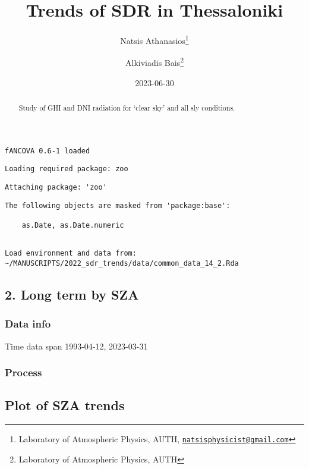 \documentclass[
  10pt,
  a4paper,oneside]{article}
\title{Trends of SDR in Thessaloniki}
\author{Natsis Athanasios\footnote{Laboratory of Atmospheric Physics, AUTH, \href{mailto:natsisphysicist@gmail.com}{\nolinkurl{natsisphysicist@gmail.com}}} \and Alkiviadis Bais\footnote{Laboratory of Atmospheric Physics, AUTH}}
\date{2023-06-30}
\begin{document}
\maketitle
\begin{abstract}
Study of GHI and DNI radiation for `clear sky' and all sly conditions.
\end{abstract}

{
\hypersetup{linkcolor=}
\setcounter{tocdepth}{4}
\tableofcontents
}
\begin{verbatim}
fANCOVA 0.6-1 loaded
\end{verbatim}

\begin{verbatim}
Loading required package: zoo
\end{verbatim}

\begin{verbatim}
Attaching package: 'zoo'
\end{verbatim}

\begin{verbatim}
The following objects are masked from 'package:base':

    as.Date, as.Date.numeric
\end{verbatim}

\begin{verbatim}

Load environment and data from:  ~/MANUSCRIPTS/2022_sdr_trends/data/common_data_14_2.Rda 
\end{verbatim}

\hypertarget{long-term-by-sza}{%
\subsection{2. Long term by SZA}\label{long-term-by-sza}}

\hypertarget{data-info}{%
\subsubsection{Data info}\label{data-info}}

Time data span 1993-04-12, 2023-03-31

\hypertarget{process}{%
\subsubsection{Process}\label{process}}

\FloatBarrier

\hypertarget{plot-of-sza-trends}{%
\subsection{Plot of SZA trends}\label{plot-of-sza-trends}}
\end{document}
